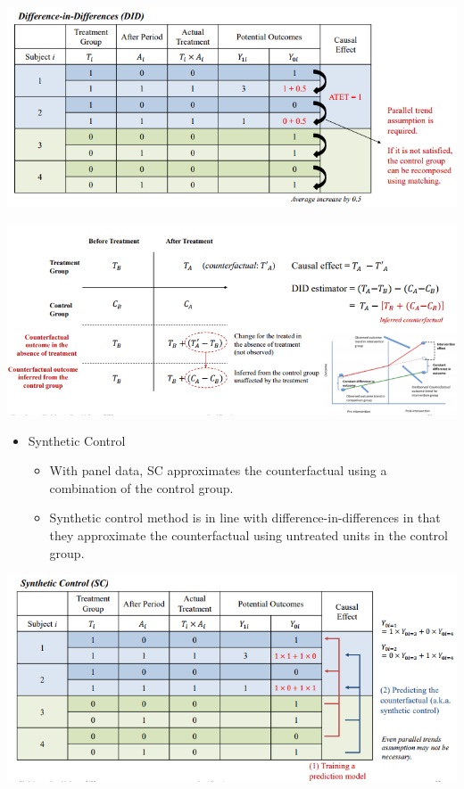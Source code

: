 \documentclass[
]{book}
\providecommand{\tightlist}{%
  \setlength{\itemsep}{0pt}\setlength{\parskip}{0pt}}
\theoremstyle{definition}
\theoremstyle{definition}
\theoremstyle{definition}
\theoremstyle{definition}
\theoremstyle{remark}
\begin{document}
\includegraphics{figures/26.png}

\includegraphics{figures/31.png}

\begin{itemize}
\tightlist
\item
  Synthetic Control

  \begin{itemize}
  \tightlist
  \item
    With panel data, SC approximates the counterfactual using a combination of the control group.
  \item
    Synthetic control method is in line with difference-in-differences in that they approximate the counterfactual using untreated units in the control group.
  \end{itemize}
\end{itemize}

\includegraphics{figures/27.png}
\end{document}
